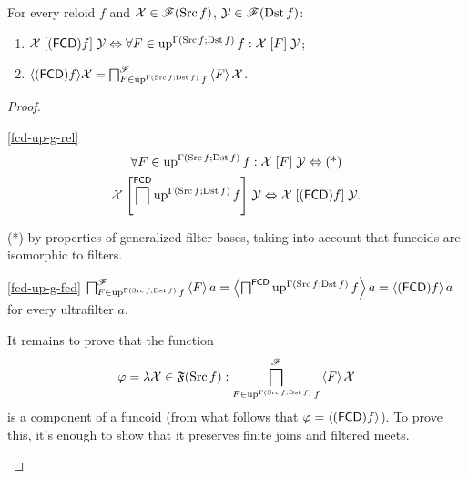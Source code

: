 \begin{thm}
For every reloid $f$ and $\mathcal{X}\in\mathscr{F}(\operatorname{Src} f)$, $\mathcal{Y}\in\mathscr{F}(\operatorname{Dst} f)$:
\begin{enumerate}
\item \label{fcd-up-g-rel}$\mathcal{X}\mathrel{[(\mathsf{FCD}) f]}\mathcal{Y}\Leftrightarrow\forall F\in\operatorname{up}^{\Gamma(\operatorname{Src} f;\operatorname{Dst} f)}f:\mathcal{X}\mathrel{\left[F\right]}\mathcal{Y}$;
\item \label{fcd-up-g-fcd}$\langle(\mathsf{FCD}) f\rangle\mathcal{X}=\bigsqcap_{F\in\operatorname{up}^{\Gamma(\operatorname{Src} f;\operatorname{Dst} f)}f}^{\mathscr{F}}\left\langle F\right\rangle\mathcal{X}$.
\end{enumerate}
\end{thm}
\begin{proof}
~
\begin{widedisorder}
\item [{\ref{fcd-up-g-rel}}] ~
\begin{multline*}
\forall F\in\operatorname{up}^{\Gamma(\operatorname{Src} f;\operatorname{Dst} f)}f:\mathcal{X}\mathrel{\left[F\right]}\mathcal{Y}\Leftrightarrow\text{(*)}\\
\mathcal{X}\mathrel{\left[\bigsqcap^{\mathsf{FCD}}\operatorname{up}^{\Gamma(\operatorname{Src} f;\operatorname{Dst} f)}f\right]}\mathcal{Y}\Leftrightarrow\mathcal{X}\mathrel{\left[(\mathsf{FCD}) f\right]}\mathcal{Y}.
\end{multline*}



({*}) by properties of generalized filter bases, taking into account
that funcoids are isomorphic to filters.

\item [{\ref{fcd-up-g-fcd}}] $\bigsqcap_{F\in\operatorname{up}^{\Gamma(\operatorname{Src} f;\operatorname{Dst} f)}f}^{\mathscr{F}}\left\langle F\right\rangle a=\left\langle \bigsqcap^{\mathsf{FCD}}\operatorname{up}^{\Gamma(\operatorname{Src} f;\operatorname{Dst} f)}f\right\rangle a=\left\langle (\mathsf{FCD}) f\right\rangle a$
for every ultrafilter $a$.


It remains to prove that the function 
\[
\varphi=\lambda\mathcal{X}\in\mathfrak{F}(\operatorname{Src} f):\bigsqcap_{F\in\operatorname{up}^{\Gamma(\operatorname{Src} f;\operatorname{Dst} f)}f}^{\mathscr{F}}\left\langle F\right\rangle\mathcal{X}
\]
is a component of a funcoid (from what follows that $\varphi=\left\langle (\mathsf{FCD}) f\right\rangle$).
To prove this, it's enough to show that it preserves finite joins
and filtered meets.



\end{widedisorder}
\end{proof}
